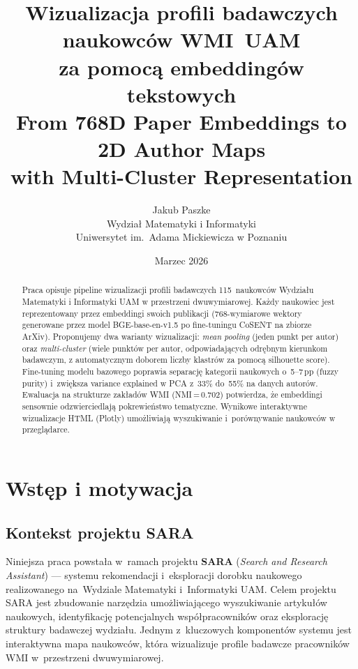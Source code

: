\documentclass[a4paper,11pt]{article}
\title{%
  \textbf{Wizualizacja profili badawczych naukowców WMI~UAM\\
  za pomocą embeddingów tekstowych}\\[6pt]
  \large From 768D Paper Embeddings to 2D Author Maps\\
  with Multi-Cluster Representation
}
\author{%
  Jakub Paszke\\
  \small Wydział Matematyki i Informatyki\\
  \small Uniwersytet im.\ Adama Mickiewicza w Poznaniu
}
\date{Marzec 2026}
\begin{document}
\maketitle
\thispagestyle{empty}

\begin{abstract}
Praca opisuje pipeline wizualizacji profili badawczych 115~naukowców Wydziału Matematyki i Informatyki UAM w przestrzeni dwuwymiarowej.
Każdy naukowiec jest reprezentowany przez embeddingi swoich publikacji (768-wymiarowe wektory generowane przez model BGE-base-en-v1.5 po fine-tuningu CoSENT na zbiorze ArXiv).
Proponujemy dwa warianty wizualizacji: \emph{mean pooling} (jeden punkt per autor) oraz \emph{multi-cluster} (wiele punktów per autor, odpowiadających odrębnym kierunkom badawczym, z automatycznym doborem liczby klastrów za pomocą silhouette score).
Fine-tuning modelu bazowego poprawia separację kategorii naukowych o~5--7\,pp (fuzzy purity) i~zwiększa variance explained w PCA z~33\% do~55\% na danych autorów.
Ewaluacja na strukturze zakładów WMI (NMI\,=\,0.702) potwierdza, że embeddingi sensownie odzwierciedlają pokrewieństwo tematyczne.
Wynikowe interaktywne wizualizacje HTML (Plotly) umożliwiają wyszukiwanie i~porównywanie naukowców w przeglądarce.
\end{abstract}

\tableofcontents
\newpage

\section{Wstęp i motywacja}

\subsection{Kontekst projektu SARA}

Niniejsza praca powstała w~ramach projektu \textbf{SARA} (\emph{Search and Research Assistant}) --- systemu rekomendacji i~eksploracji dorobku naukowego realizowanego na~Wydziale Matematyki i~Informatyki UAM.
Celem projektu SARA jest zbudowanie narzędzia umożliwiającego wyszukiwanie artykułów naukowych, identyfikację potencjalnych współpracowników oraz eksplorację struktury badawczej wydziału.
Jednym z~kluczowych komponentów systemu jest interaktywna mapa naukowców, która wizualizuje profile badawcze pracowników WMI w~przestrzeni dwuwymiarowej.
\end{document}

